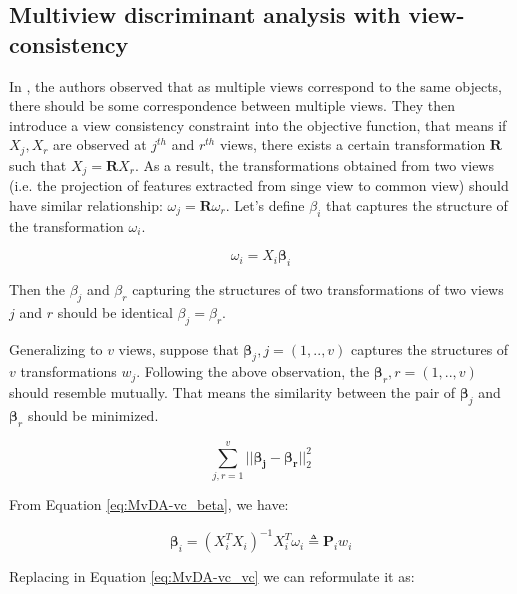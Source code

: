     \subsection{Multiview discriminant analysis with view-consistency}

        In \cite{kan2016multi}, the authors observed that as multiple views correspond to the same objects, there should be some correspondence between multiple views.
        They then introduce a view consistency constraint into the objective function, that means if $X_j, X_r$ are observed at $j^{th}$ and $r^{th}$ views, there exists a certain transformation $\boldsymbol{R}$ such that $X_j = \boldsymbol{R}X_r$.
        As a result, the transformations obtained from two views (i.e. the projection of features extracted from singe view to common view) should have similar relationship: ${\omega}_j = \boldsymbol{R}{\omega}_r$.
        Let's define $\beta_i$ that captures the structure of the transformation ${\omega}_i$.

        \begin{equation}
            \omega_i = X_i\boldsymbol\beta_i
            \label{eq:MvDA-vc_beta}
        \end{equation}

        Then the $\beta_j$ and $\beta_r$ capturing the structures of two transformations of two views $j$ and $r$ should be identical ${\beta}_j = {\beta}_r$.

        Generalizing to $v$ views, suppose that ${\boldsymbol\beta}_j, j=(1,..,v)$ captures the structures of $v$ transformations ${w}_j$.
        Following the above observation, the $\boldsymbol{\beta}_r, r=(1,..,v)$ should resemble mutually.
        That means the similarity between the pair of $\boldsymbol{\beta}_j$ and $\boldsymbol{\beta}_r$ should be minimized. 

        \begin{equation}
            \sum_{j,r=1}^{v}||\boldsymbol{\beta_j} - \boldsymbol{\beta_r}||_2^2
            \label{eq:MvDA-vc_vc}
        \end{equation}

        From Equation \eqref{eq:MvDA-vc_beta}, we have:

        \begin{equation}
            \boldsymbol\beta_i = {\left(X_i^{T}X_i\right)}^{-1}X_i^{T}\omega_i \triangleq \boldsymbol{P}_iw_i
        \end{equation}

        Replacing in Equation \eqref{eq:MvDA-vc_vc} we can reformulate it as:

